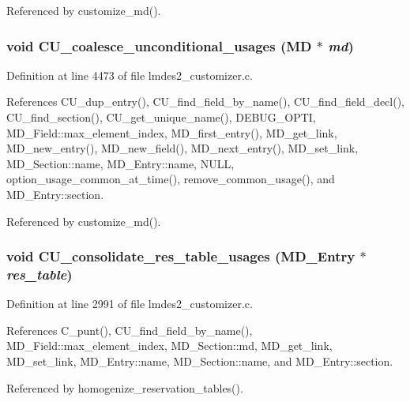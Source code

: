 Referenced by customize\_\-md().
\subsubsection{\setlength{\rightskip}{0pt plus 5cm}void CU\_\-coalesce\_\-unconditional\_\-usages (\bf{MD} $\ast$ {\em md})}\label{lmdes2__customizer_8c_f2197180102ce352a30d4087b462e14e}




Definition at line 4473 of file lmdes2\_\-customizer.c.

References CU\_\-dup\_\-entry(), CU\_\-find\_\-field\_\-by\_\-name(), CU\_\-find\_\-field\_\-decl(), CU\_\-find\_\-section(), CU\_\-get\_\-unique\_\-name(), DEBUG\_\-OPTI, MD\_\-Field::max\_\-element\_\-index, MD\_\-first\_\-entry(), MD\_\-get\_\-link, MD\_\-new\_\-entry(), MD\_\-new\_\-field(), MD\_\-next\_\-entry(), MD\_\-set\_\-link, MD\_\-Section::name, MD\_\-Entry::name, NULL, option\_\-usage\_\-common\_\-at\_\-time(), remove\_\-common\_\-usage(), and MD\_\-Entry::section.

Referenced by customize\_\-md().
\subsubsection{\setlength{\rightskip}{0pt plus 5cm}void CU\_\-consolidate\_\-res\_\-table\_\-usages (\bf{MD\_\-Entry} $\ast$ {\em res\_\-table})}\label{lmdes2__customizer_8c_0ef75bfb7f290b6513271853e6fd74fc}




Definition at line 2991 of file lmdes2\_\-customizer.c.

References C\_\-punt(), CU\_\-find\_\-field\_\-by\_\-name(), MD\_\-Field::max\_\-element\_\-index, MD\_\-Section::md, MD\_\-get\_\-link, MD\_\-set\_\-link, MD\_\-Entry::name, MD\_\-Section::name, and MD\_\-Entry::section.

Referenced by homogenize\_\-reservation\_\-tables().
